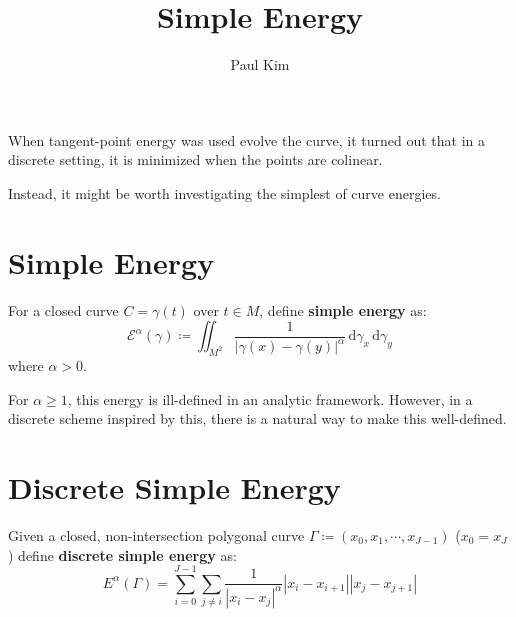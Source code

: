 \documentclass[a4paper]{article}
\title{Simple Energy}
\author{Paul Kim}
\newcommand{\dgamma}{\, \text{d}\gamma}
\begin{document}
\maketitle
When tangent-point energy was used evolve the curve, it turned out that in a discrete setting,
it is minimized when the points are colinear.

Instead, it might be worth investigating the simplest of curve energies.
\section{Simple Energy}
For a closed curve $C = \gamma(t)$ over $t \in M$, define \textbf{simple energy} as:
\begin{equation}
    \mathcal{E}^{\alpha} \left( \gamma \right) \coloneqq \iint_{M^2} \frac{1}{|\gamma(x) - \gamma(y)|^{\alpha}} \dgamma_x \dgamma_y
\end{equation}
where $\alpha > 0$.

For $\alpha \geq 1$, this energy is ill-defined in an analytic framework.
However, in a discrete scheme inspired by this, there is a natural way to make this well-defined.

\section{Discrete Simple Energy}
Given a closed, non-intersection polygonal curve $\Gamma \coloneqq \left( x_0, x_1, \cdots, x_{J-1} \right)$
($x_0 = x_J$)
define \textbf{discrete simple energy} as:
\begin{equation}
    E^{\alpha}\left( \Gamma \right) = \sum_{i=0}^{J-1} \sum_{j \neq i} \frac{1}{|x_i -x_j|^{\alpha}} |x_i - x_{i+1}| |x_j - x_{j+1}|
\end{equation}
\end{document}
